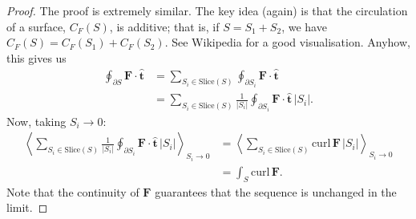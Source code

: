 \documentclass{article}
\theoremstyle{definition}
\begin{document}
\begin{proof}
	The proof is extremely similar. The key idea (again) is that the circulation of a surface, $C_F(S)$, is additive; that is, if $S=S_1+S_2$, we have $C_F(S)=C_F(S_1)+C_F(S_2)$. See Wikipedia for a good visualisation.
	Anyhow, this gives us
	\begin{align*}
		\oint_{\partial S}\mathbf{F}\cdot\hat{\mathbf{t}}&=\sum_{S_i\in\text{Slice}(S)}\oint_{\partial S_i}\mathbf{F}\cdot\hat{\mathbf{t}}\\
		&=\sum_{S_i\in\text{Slice}(S)}\frac{1}{\lvert S_i\rvert}\oint_{\partial S_i}\mathbf{F}\cdot\hat{\mathbf{t}}\,\lvert S_i\rvert.
	\end{align*}
	Now, taking $S_i\rightarrow0$:
	\begin{align*}
		\left\langle\sum_{S_i\in\text{Slice}(S)}\frac{1}{\lvert S_i\rvert}\oint_{\partial S_i}\mathbf{F}\cdot\hat{\mathbf{t}}\,\lvert S_i\rvert\right\rangle_{S_i\rightarrow0}&=\left\langle\sum_{S_i\in\text{Slice}(S)}\text{curl}\,\mathbf{F}\,\lvert S_i\rvert\right\rangle_{S_i\rightarrow0}\\
		&=\int_S\text{curl}\,\mathbf{F}.
	\end{align*}
	Note that the continuity of $\mathbf{F}$ guarantees that the sequence is unchanged in the limit.
\end{proof}

\newpage
\end{document}
